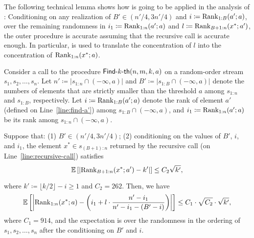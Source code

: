 The following technical lemma shows how  is going to be applied in the analysis of : Conditioning on any realization of $B' \in (n'/4, 3n'/4)$ and $i \coloneqq \mathrm{Rank}_{1:B}(a'; a)$, over the remaining randomness in $i_1\coloneqq \mathrm{Rank}_{1:n}(a'; a)$ and $l\coloneqq \mathrm{Rank}_{B+1:n}(x^*; a')$, the outer procedure is accurate assuming that the recursive call is accurate enough. In particular,  is used to translate the concentration of $l$ into the concentration of $\mathrm{Rank}_{1:n}(x^*; a)$.

\begin{lemma}\label{lemma:rank-in-second-half-to-overall-simplified}
    Consider a call to the procedure $\textsf{Find-}k\textsf{-th}(n, m, k, a)$ on a random-order stream $s_1, s_2, \ldots, s_n$. Let $n' \coloneqq |s_{1:n} \cap (-\infty, a)|$ and $B' \coloneqq |s_{1:B} \cap (-\infty, a)|$ denote the numbers of elements that are strictly smaller than the threshold $a$ among $s_{1:n}$ and $s_{1:B}$, respectively. Let $i \coloneqq \mathrm{Rank}_{1:B}(a'; a)$ denote the rank of element $a'$ (defined on Line~\ref{line:find-a'}) among $s_{1:B} \cap (-\infty, a)$, and $i_1 \coloneqq \mathrm{Rank}_{1:n}(a'; a)$ be its rank among $s_{1:n} \cap (-\infty, a)$.
    
    Suppose that: (1) $B' \in (n'/4, 3n'/4)$; (2) conditioning on the values of $B'$, $i$, and $i_1$, the element $x^* \in s_{(B+1):n}$ returned by the recursive call (on Line~\ref{line:recursive-call}) satisfies
    \[
        \operatorname*{\mathbb{E}}_{}\left[\left|\mathrm{Rank}_{{B+1:n}}(x^*; a')- k'\right|\right] \le C_2\sqrt{k'},
    \]
    where $k' \coloneqq \lfloor k/2\rfloor - i \ge 1$ and $C_2 = 262$. Then, we have
    \[
    \operatorname*{\mathbb{E}}_{}\left[\left|\mathrm{Rank}_{{1:n}}(x^*; a) - \left(i_1+l\cdot \frac{n'-i_1}{n'-i_1-(B'-i)}\right)\right|\right] \le C_1\cdot\sqrt{C_2}\cdot\sqrt{k'},
    \]
    where $C_1 = 914$, and the expectation is over the randomness in the ordering of $s_1, s_2, \ldots, s_n$ after the conditioning on $B'$ and $i$.
\end{lemma}
